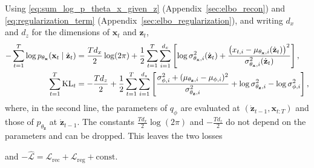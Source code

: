 Using \eqref{eq:sum_log_p_theta_x_given_z} (Appendix~\ref{sec:elbo_recon})
and \eqref{eq:regularization_term}
(Appendix~\ref{sec:elbo_regularization}), and writing $d_x$ and $d_z$ for
the dimensions of $\mathbf{x}_t$ and $\mathbf{z}_t$,
\begin{align*}
    -\sum_{t=1}^T \log p_{\theta_{\mathbf{x}}}(\mathbf{x}_t \mid
    \dot{\mathbf{z}}_{t}) &= \frac{T d_x}{2} \log(2\pi) +
    \frac{1}{2} \sum_{t=1}^T \sum_{i=1}^{d_x} \left[ \log
    \sigma^2_{\theta_{\mathbf{x}}, i}(\dot{\mathbf{z}}_{t}) +
    \frac{\big(x_{t,i} - \mu_{\theta_{\mathbf{x}}, i}(\dot{\mathbf{z}}_{t})
    \big)^2}{\sigma^2_{\theta_{\mathbf{x}}, i}(\dot{\mathbf{z}}_{t})}
    \right], \\
    \sum_{t=1}^T \mathrm{KL}_t &= -\frac{T d_z}{2} + \frac{1}{2} \sum_{t=1}^T
    \sum_{i=1}^{d_z} \left[ \frac{\sigma^2_{\phi, i} + (\mu_{\theta_{
    \mathbf{z}}, i} - \mu_{\phi, i})^2}{\sigma^2_{\theta_{\mathbf{z}},
    i}} + \log \sigma^2_{\theta_{\mathbf{z}}, i} - \log \sigma^2_{\phi,
    i} \right],
\end{align*}
where, in the second line, the parameters of $q_\phi$ are evaluated at
$(\dot{\mathbf{z}}_{t-1}, \mathbf{x}_{t:T})$ and those of
$p_{\theta_{\mathbf{z}}}$ at $\dot{\mathbf{z}}_{t-1}$. The constants
$\frac{T d_x}{2}\log(2\pi)$ and $-\frac{T d_z}{2}$ do not depend on the
parameters and can be dropped. This leaves the two losses

\begin{center}
\qquad
{}
\end{center}
and $-\hat{\mathcal{L}} = \mathcal{L}_{\text{rec}} +
\mathcal{L}_{\text{reg}} + \text{const}$.

